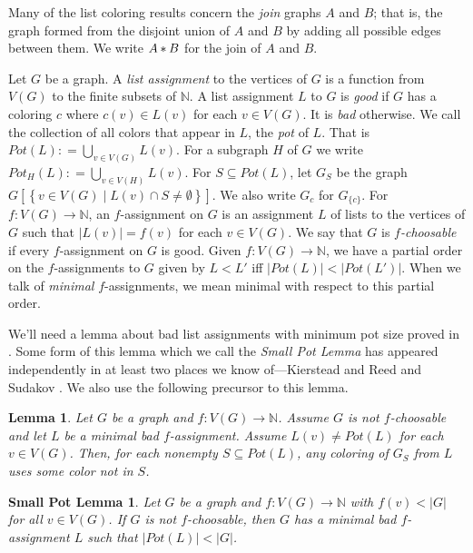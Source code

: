 \documentclass[12pt]{article}
\theoremstyle{plain}
\newtheorem{lem}[thm]{Lemma}
\newtheorem*{SmallPotLemma}{Small Pot Lemma}
\theoremstyle{definition}
\theoremstyle{remark}
\newcommand{\IN}{\mathbb{N}}
\newcommand{\setb}[3]{\left\{ #1 \in #2 \mid #3 \right\}}
\newcommand{\card}[1]{\left|#1\right|}
\newcommand{\func}[3]{#1\colon #2 \rightarrow #3}
\newcommand{\join}[2]{#1 \mbox{\hspace{2 pt}$\ast$\hspace{2 pt}} #2}
\newcommand{\DefinedAs}{\mathrel{\mathop:}=}
\begin{document}
Many of the list coloring results concern the \emph{join} graphs $A$ and $B$; that is, the graph formed from the disjoint union of $A$ and $B$ by adding all possible edges between them.
We write $\join{A}{B}$ for the join of $A$ and $B$.

Let $G$ be a graph.  A \emph{list assignment} to the vertices of $G$ is a
function from $V(G)$ to the finite subsets of $\mathbb{N}$.  A list assignment
$L$ to $G$ is \emph{good} if $G$ has a coloring $c$ where $c(v) \in L(v)$ for
each $v \in V(G)$.  It is \emph{bad} otherwise.  We call the collection of all
colors that appear in $L$, the \emph{pot} of $L$.  That is $Pot(L) \DefinedAs
\bigcup_{v \in V(G)} L(v)$.  For a subgraph $H$ of $G$ we write $Pot_H(L)
\DefinedAs \bigcup_{v \in V(H)} L(v)$. For $S \subseteq Pot(L)$, let $G_S$ be
the graph $G\left[\setb{v}{V(G)}{L(v) \cap S \neq \emptyset}\right]$.  We also
write $G_c$ for $G_{\{c\}}$. For $\func{f}{V(G)}{\IN}$, an $f$-assignment on $G$ is an
assignment $L$ of lists to the vertices of $G$ such that $\card{L(v)} = f(v)$
for each $v \in V(G)$.  We say that $G$ is \textit{$f$-choosable} if every
$f$-assignment on $G$ is good.  Given $\func{f}{V(G)}{\mathbb{N}}$, we have a partial order on the $f$-assignments to $G$ given by $L < L'$ iff $\card{Pot(L)} < \card{Pot(L')}$.  When we talk of \emph{minimal} $f$-assignments, we mean minimal with respect to this partial order.

We'll need a lemma about bad list assignments with minimum pot size proved in \cite{mules}.
Some form of this lemma which we call the \emph{Small Pot Lemma} has appeared independently in at least two places we know of---Kierstead \cite{kierstead2000choosability} and Reed and Sudakov \cite{ReedSudakov}.  We also use the following precursor to this lemma.

\begin{lem}\label{CannotColorSelfWithSelf}
Let $G$ be a graph and $\func{f}{V(G)}{\mathbb{N}}$.  Assume $G$ is not $f$-choosable and let $L$ be a minimal bad $f$-assignment. Assume $L(v) \neq Pot(L)$ for each $v \in V(G)$.  Then, for each nonempty $S \subseteq Pot(L)$, any coloring of $G_S$ from $L$ uses some color not in $S$.
\end{lem}

\begin{SmallPotLemma}
Let $G$ be a graph and $\func{f}{V(G)}{\mathbb{N}}$ with $f(v) < \card{G}$ for all $v \in V(G)$.  If $G$ is not $f$-choosable, then $G$ has a minimal bad $f$-assignment $L$ such that $\card{Pot(L)} < \card{G}$.
\end{SmallPotLemma}
\end{document}

